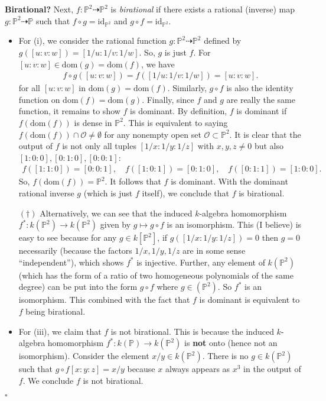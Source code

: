 \documentclass[12pt]{article}
\begin{document}
\noindent \textbf{Birational?} Next, $f: \mathbb{P}^2 \dashrightarrow \mathbb{P}^2$ is \textit{birational} if there exists a rational (inverse) map $g: \mathbb{P}^2 \dashrightarrow \mathbb{P}$ such that $f\circ g = \mbox{id}_{\mathbb{P}^2}$ and $g\circ f = \mbox{id}_{\mathbb{P}^2}$. 
\begin{itemize}
\item For (i), we consider the rational function $g : \mathbb{P}^2 \dashrightarrow \mathbb{P}^2$ defined by $g([u:v:w]) = [1/u:1/v:1/w]$. So, $g$ is just $f$. For $[u:v:w] \in \mbox{dom}(g) = \mbox{dom}(f)$, we have
\begin{align*}
f\circ g([u:v:w]) = f([1/u:1/v:1/w]) = [u:v:w].
\end{align*}
for all $[u:v:w]$ in $\mbox{dom}(g) = \mbox{dom}(f)$. Similarly, $g\circ f$ is also the identity function on $\mbox{dom}(f) = \mbox{dom}(g)$. Finally, since $f$ and $g$ are really the same function, it remains to show $f$ is dominant. By definition, $f$ is dominant if $f(\mbox{dom}(f))$ is dense in $\mathbb{P}^2$. This is equivalent to saying $f(\mbox{dom}(f)) \cap \mathcal{O} \neq \emptyset$ for any nonempty open set $\mathcal{O} \subset \mathbb{P}^2$. It is clear that the output of $f$ is not only all tuples $[1/x:1/y:1/z]$ with $x,y,z\neq 0$ but also $[1:0:0], [0:1:0], [0:0:1]$: 
\begin{align*}
f([1:1:0]) = [0:0:1], \quad f([1:0:1]) = [0:1:0], \quad 
f([0:1:1]) = [1:0:0].
\end{align*}  
So, $f(\mbox{dom}(f)) = \mathbb{P}^2$. It follows that $f$ is dominant. With the dominant rational inverse $g$ (which is just $f$ itself), we conclude that $f$ is birational. 


$(\dagger)$ Alternatively, we can see that the induced $k$-algebra homomorphism $f^*: k(\mathbb{P}^2) \to k(\mathbb{P}^2)$ given by $g \mapsto g\circ f$ is an isomorphism. This (I believe) is easy to see because for any $g\in k[\mathbb{P}^2]$, if $g([1/x:1/y:1/z]) = 0$ then $g =0$ necessarily (because the factors $1/x, 1/y,1/z$ are in some sense ``independent''), which shows $f^*$ is injective. Further, any element of $k(\mathbb{P}^2)$ (which has the form of a ratio of two homogeneous polynomials of the same degree) can be put into the form $g\circ f$ where $g\in (\mathbb{P}^2)$. So $f^*$ is an isomorphism. This combined with the fact that $f$ is dominant is equivalent to $f$ being birational.  


\item For (iii), we claim that $f$ is not birational. This is because the induced $k$-algebra homomorphism $f^* : k(\mathbb{P}) \to k(\mathbb{P}^2)$ is \textbf{not} onto (hence not an isomorphism).  Consider the element $x/y \in k(\mathbb{P}^2)$. There is no $g\in k(\mathbb{P}^2)$ such that $g\circ f[x:y:z] = x/y$ because $x$ always appears as $x^3$ in the output of $f$. We conclude $f$ is not birational.
\end{itemize}
\hfill $\square$
\end{document}
